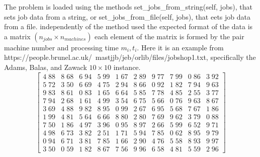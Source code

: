 \documentclass[11pt, a4paper]{article}
\begin{document}
The problem is loaded using the methods set\_jobs\_from\_string(self, jobs), that sets job data from a string, or 
set\_jobs\_from\_file(self, jobs), that eets job data from a file. independently of the method used the expected
format of the data is a matrix \((n_{jobs} \times n_{machines})\) each element of the matrix is formed by the pair
machine number and processing time \(m_{i}, t_{i}\). Here it is an example from https://people.brunel.ac.uk/~mastjjb/jeb/orlib/files/jobshop1.txt,
specifically the Adams, Balas, and Zawack \(10 \times 10\) instance.
\[
\begin{bmatrix}
4\; 88 & 8\; 68 & 6\; 94 & 5\; 99 & 1\; 67 & 2\; 89 & 9\; 77 & 7\; 99 & 0\; 86 & 3\; 92 \\
5\; 72 & 3\; 50 & 6\; 69 & 4\; 75 & 2\; 94 & 8\; 66 & 0\; 92 & 1\; 82 & 7\; 94 & 9\; 63 \\
9\; 83 & 8\; 61 & 0\; 83 & 1\; 65 & 6\; 64 & 5\; 85 & 7\; 78 & 4\; 85 & 2\; 55 & 3\; 77 \\
7\; 94 & 2\; 68 & 1\; 61 & 4\; 99 & 3\; 54 & 6\; 75 & 5\; 66 & 0\; 76 & 9\; 63 & 8\; 67 \\
3\; 69 & 4\; 88 & 9\; 82 & 8\; 95 & 0\; 99 & 2\; 67 & 6\; 95 & 5\; 68 & 7\; 67 & 1\; 86 \\
1\; 99 & 4\; 81 & 5\; 64 & 6\; 66 & 8\; 80 & 2\; 80 & 7\; 69 & 9\; 62 & 3\; 79 & 0\; 88 \\
7\; 50 & 1\; 86 & 4\; 97 & 3\; 96 & 0\; 95 & 8\; 97 & 2\; 66 & 5\; 99 & 6\; 52 & 9\; 71 \\
4\; 98 & 6\; 73 & 3\; 82 & 2\; 51 & 1\; 71 & 5\; 94 & 7\; 85 & 0\; 62 & 8\; 95 & 9\; 79 \\
0\; 94 & 6\; 71 & 3\; 81 & 7\; 85 & 1\; 66 & 2\; 90 & 4\; 76 & 5\; 58 & 8\; 93 & 9\; 97 \\
3\; 50 & 0\; 59 & 1\; 82 & 8\; 67 & 7\; 56 & 9\; 96 & 6\; 58 & 4\; 81 & 5\; 59 & 2\; 96
\end{bmatrix}
\]
\end{document}
